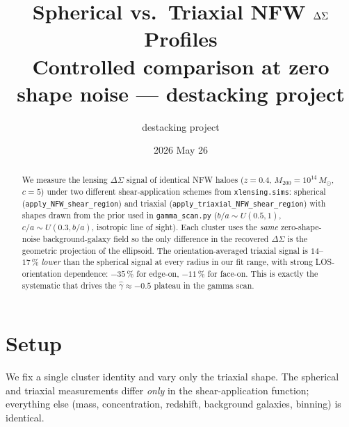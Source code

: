 \documentclass[11pt,a4paper]{article}
\title{\textbf{Spherical vs.\ Triaxial NFW $\DS$ Profiles}\\[0.4em]
\large Controlled comparison at zero shape noise --- destacking project}
\author{destacking project}
\date{2026 May 26}
\newcommand{\DS}{\Delta\Sigma}
\newcommand{\Msun}{\,M_{\odot}}
\begin{document}
\maketitle

\begin{abstract}
We measure the lensing $\DS$ signal of identical NFW haloes
($z=0.4$, $M_{200}=10^{14}\Msun$, $c=5$) under two different shear-application
schemes from \texttt{xlensing.sims}: spherical
(\texttt{apply\_NFW\_shear\_region}) and triaxial
(\texttt{apply\_triaxial\_NFW\_shear\_region}) with shapes drawn from the
prior used in \texttt{gamma\_scan.py} ($b/a\sim U(0.5,1)$,
$c/a\sim U(0.3,b/a)$, isotropic line of sight).  Each cluster uses the
\emph{same} zero-shape-noise background-galaxy field so the only difference
in the recovered $\DS$ is the geometric projection of the ellipsoid.
The orientation-averaged triaxial signal is $14$--$17\,\%$ \emph{lower} than
the spherical signal at every radius in our fit range, with strong
LOS-orientation dependence: $-35\,\%$ for edge-on, $-11\,\%$ for face-on.
This is exactly the systematic that drives the
$\hat\gamma\approx-0.5$ plateau in the gamma scan.
\end{abstract}

\tableofcontents
\newpage

\section{Setup}

We fix a single cluster identity and vary only the triaxial shape.  The
spherical and triaxial measurements differ \emph{only} in the shear-application
function; everything else (mass, concentration, redshift, background galaxies,
binning) is identical.
\end{document}
